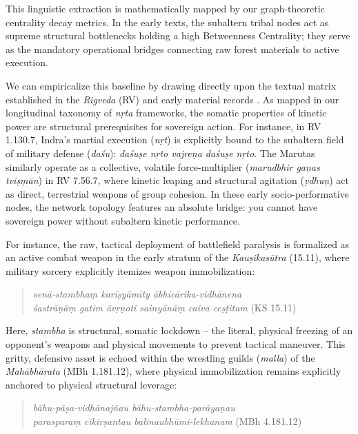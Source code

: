 \documentclass[11pt,twoside,letterpaper]{article}
\begin{document}
This linguistic extraction is mathematically mapped by our graph-theoretic centrality decay metrics. In the early texts, the subaltern tribal nodes act as supreme structural bottlenecks holding a high Betweenness Centrality; they serve as the mandatory operational bridges connecting raw forest materials to active execution. 

We can empiricalize this baseline by drawing directly upon the textual matrix established in the \textit{Rigveda} (RV) and early material records \citep{mccartney2026}. As mapped in our longitudinal taxonomy of \textit{nṛta} frameworks, the somatic properties of kinetic power are structural prerequisites for sovereign action. For instance, in RV 1.130.7, Indra's martial execution (\textit{nṛt}) is explicitly bound to the subaltern field of military defense (\textit{daśu}): \textit{daśuṣe nṛto vajreṇa daśuṣe nṛto}. The Marutas similarly operate as a collective, volatile force-multiplier (\textit{marudbhir gaṇas tviṣṃān}) in RV 7.56.7, where kinetic leaping and structural agitation (\textit{ṿdhuṇ}) act as direct, terrestrial weapons of group cohesion. In these early socio-performative nodes, the network topology features an absolute bridge: you cannot have sovereign power without subaltern kinetic performance.

For instance, the raw, tactical deployment of battlefield paralysis is formalized as an active combat weapon in the early stratum of the \textit{Kauṣikasūtra} (15.11), where military sorcery explicitly itemizes weapon immobilization:

\begin{quote}
\textit{senā-stambhaṃ karīṣyāmīty ābhicārika-vidhānena} \\
\textit{śastrāṇāṃ gatim āvṛṇoti sainyānāṃ caiva ceṣṭitam} (KS 15.11)
\end{quote}

Here, \textit{stambha} is structural, somatic lockdown -- the literal, physical freezing of an opponent's weapons and physical movements to prevent tactical maneuver. This gritty, defensive asset is echoed within the wrestling guilds (\textit{malla}) of the \textit{Mahābhārata} (MBh 1.181.12), where physical immobilization remains explicitly anchored to physical structural leverage:
\begin{quote}
\textit{bāhu-pāṣa-vidhānajñau bāhu-stambha-parāyaṇau } \\
\textit{parasparaṃ cikīrṣantau balinaubhūmi-lekhanam} (MBh 4.181.12)
\end{quote}
\end{document}
